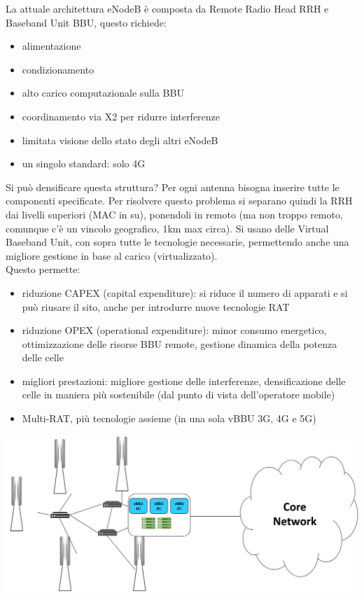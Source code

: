 La attuale architettura eNodeB è composta da Remote Radio Head RRH e Baseband Unit BBU, questo richiede: 
\begin{itemize}
	\item alimentazione
	\item condizionamento
	\item alto carico computazionale sulla BBU
	\item coordinamento via X2 per ridurre interferenze
	\item limitata visione dello stato degli altri eNodeB
	\item un singolo standard: solo 4G
\end{itemize}

Si può densificare questa struttura? Per ogni antenna bisogna inserire tutte le componenti specificate. Per risolvere questo problema si separano quindi la RRH dai livelli superiori (MAC in su), ponendoli in remoto (ma non troppo remoto, comunque c'è un vincolo geografico, 1km max circa). Si usano delle Virtual Baseband Unit, con sopra tutte le tecnologie necessarie, permettendo anche una migliore gestione in base al carico (virtualizzato).\\

Questo permette:
\begin{itemize}
	\item riduzione CAPEX (capital expenditure): si riduce il numero di apparati e si può riusare il sito, anche per introdurre nuove tecnologie RAT
	\item riduzione OPEX (operational expenditure): minor consumo energetico, ottimizzazione delle risorse BBU remote, gestione dinamica della potenza delle celle
	\item migliori prestazioni: migliore gestione delle interferenze, densificazione delle celle in maniera più sostenibile (dal punto di vista dell'operatore mobile)
	\item Multi-RAT, più tecnologie assieme (in una sola vBBU 3G, 4G e 5G)
\end{itemize}
\begin{center}
	\includegraphics[width=0.98\linewidth]{img/5g/vbbu}
\end{center}


